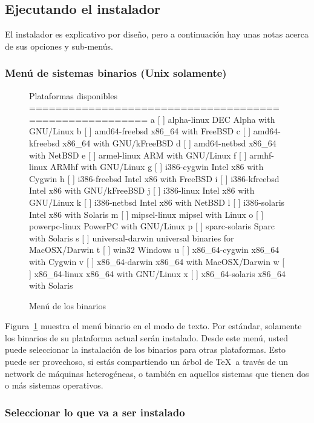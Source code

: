 \documentclass{article}
\begin{document}
\subsection{Ejecutando el instalador}
\label{sec:runinstall}

El instalador es explicativo por diseño, pero a continuación hay unas
notas acerca de sus opciones y sub-menús. 

\subsubsection{Menú de sistemas binarios (Unix solamente)}
\label{sec:binary}

\begin{figure}[tb]
\begin{boxedverbatim}
Plataformas disponibles
========================================================
   a [ ] alpha-linux      DEC Alpha with GNU/Linux
   b [ ] amd64-freebsd    x86_64 with FreeBSD
   c [ ] amd64-kfreebsd   x86_64 with GNU/kFreeBSD
   d [ ] amd64-netbsd     x86_64 with NetBSD
   e [ ] armel-linux      ARM with GNU/Linux
   f [ ] armhf-linux      ARMhf with GNU/Linux
   g [ ] i386-cygwin      Intel x86 with Cygwin
   h [ ] i386-freebsd     Intel x86 with FreeBSD
   i [ ] i386-kfreebsd    Intel x86 with GNU/kFreeBSD
   j [ ] i386-linux       Intel x86 with GNU/Linux
   k [ ] i386-netbsd      Intel x86 with NetBSD
   l [ ] i386-solaris     Intel x86 with Solaris
   m [ ] mipsel-linux     mipsel with Linux
   o [ ] powerpc-linux    PowerPC with GNU/Linux
   p [ ] sparc-solaris    Sparc with Solaris
   s [ ] universal-darwin universal binaries for MacOSX/Darwin
   t [ ] win32            Windows
   u [ ] x86_64-cygwin    x86_64 with Cygwin
   v [ ] x86_64-darwin    x86_64 with MacOSX/Darwin
   w [ ] x86_64-linux     x86_64 with GNU/Linux
   x [ ] x86_64-solaris   x86_64 with Solaris
\end{boxedverbatim}
\caption{Menú de los binarios}\label{fig:bin-text}
\end{figure}

Figura~\ref{fig:bin-text} muestra el menú binario en el modo de texto.
Por estándar, solamente los binarios de su plataforma actual serán
instalado. Desde este menú, usted puede seleccionar la instalación de
los binarios para otras plataformas. Esto puede ser provechoso, si
estás compartiendo un árbol de \TeX\ a través de un network de
máquinas heterogéneas, o también en aquellos sistemas que tienen dos o
más sistemas operativos. 

\subsubsection{Seleccionar lo que va a ser instalado}
\label{sec:components}
\end{document}
